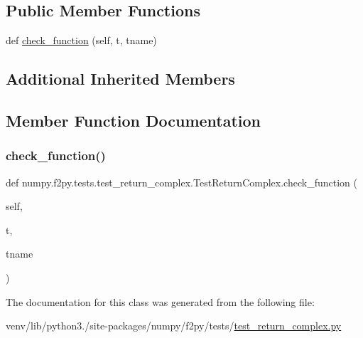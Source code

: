 \subsection*{Public Member Functions}
\begin{DoxyCompactItemize}
\item 
def \hyperlink{classnumpy_1_1f2py_1_1tests_1_1test__return__complex_1_1TestReturnComplex_abd4b43a951e4de9633e7b71cc9ad516b}{check\+\_\+function} (self, t, tname)
\end{DoxyCompactItemize}
\subsection*{Additional Inherited Members}


\subsection{Member Function Documentation}
\mbox{\label{classnumpy_1_1f2py_1_1tests_1_1test__return__complex_1_1TestReturnComplex_abd4b43a951e4de9633e7b71cc9ad516b}} 
\subsubsection{\texorpdfstring{check\+\_\+function()}{check\_function()}}
{\footnotesize\ttfamily def numpy.\+f2py.\+tests.\+test\+\_\+return\+\_\+complex.\+Test\+Return\+Complex.\+check\+\_\+function (\begin{DoxyParamCaption}\item[{}]{self,  }\item[{}]{t,  }\item[{}]{tname }\end{DoxyParamCaption})}



The documentation for this class was generated from the following file\+:\begin{DoxyCompactItemize}
\item 
venv/lib/python3./site-\/packages/numpy/f2py/tests/\hyperlink{test__return__complex_8py}{test\+\_\+return\+\_\+complex.\+py}\end{DoxyCompactItemize}
